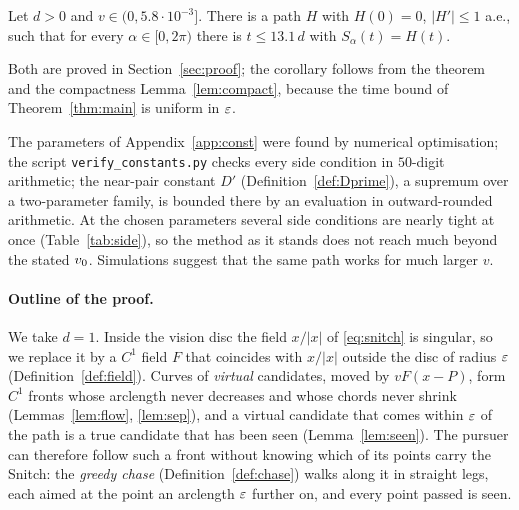 \begin{corollary}\label{cor:exact}
Let $d>0$ and $v\in(0,5.8\cdot10^{-3}]$. There is a path $H$ with $H(0)=0$, $|H'|\le1$ a.e., such that for every
$\alpha\in[0,2\pi)$ there is $t\le13.1\,d$ with $S_\alpha(t)=H(t)$.
\end{corollary}

Both are proved in Section~\ref{sec:proof}; the corollary follows from the theorem and the compactness Lemma~\ref{lem:compact},
because the time bound of Theorem~\ref{thm:main} is uniform in $\varepsilon$.

\begin{remark}\label{rem:numerics}
The parameters of Appendix~\ref{app:const} were found by numerical optimisation; the script \texttt{verify\_constants.py}
checks every side condition in $50$-digit arithmetic; the near-pair constant $D'$ (Definition~\ref{def:Dprime}), a supremum
over a two-parameter family, is bounded there by an evaluation in outward-rounded arithmetic. At the chosen parameters several
side conditions are nearly tight at once (Table~\ref{tab:side}), so the method as it stands does not reach much beyond the
stated $v_0$. Simulations suggest that the same path works for much larger $v$.
\end{remark}

\paragraph{Outline of the proof.} We take $d=1$. Inside the vision disc the field $x/|x|$ of \eqref{eq:snitch} is singular, so
we replace it by a $C^1$ field $F$ that coincides with $x/|x|$ outside the disc of radius $\varepsilon$ (Definition~\ref{def:field}).
Curves of \emph{virtual} candidates, moved by $vF(x-P)$, form $C^1$ fronts whose arclength never decreases and whose chords
never shrink (Lemmas~\ref{lem:flow}, \ref{lem:sep}), and a virtual candidate that comes within $\varepsilon$ of the path is a true
candidate that has been seen (Lemma~\ref{lem:seen}). The pursuer can therefore follow such a front without knowing which of
its points carry the Snitch: the \emph{greedy chase} (Definition~\ref{def:chase}) walks along it in straight legs, each aimed
at the point an arclength $\varepsilon$ further on, and every point passed is seen.

